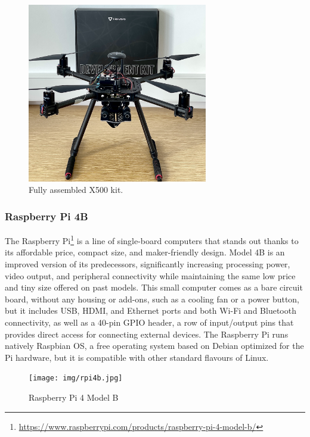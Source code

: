 \begin{figure}
  \centering
  \includegraphics[width=0.7\textwidth,keepaspectratio]{img/X500-assembled.jpg}
  \caption{Fully assembled X500 kit.}
  \label{fig:x500}
\end{figure}

\subsubsection{Raspberry Pi 4B}
\label{subsec:rpi}
The Raspberry Pi\footnote{\url{https://www.raspberrypi.com/products/raspberry-pi-4-model-b/}} is a line of single-board computers that stands out thanks to its affordable price,
compact size, and maker-friendly design. Model 4B is an improved version of its predecessors,
significantly increasing processing power, video output, and peripheral connectivity
while maintaining the same low price and tiny size offered on past models.
This small computer comes as a bare circuit board,
without any housing or add-ons, such as a cooling fan or a power button,
but it includes USB, HDMI, and Ethernet ports and both Wi-Fi and Bluetooth connectivity,
as well as a 40-pin GPIO header, a row of input/output pins that provides direct access for connecting external devices.
The Raspberry Pi runs natively Raspbian OS, a free operating system based on Debian optimized for the Pi hardware, but it is compatible with other standard flavours of Linux.

\begin{figure}
  \centering
  \texttt{[image: img/rpi4b.jpg]}
  \caption{Raspberry Pi 4 Model B}
  \label{fig:rpi4b}
\end{figure}
